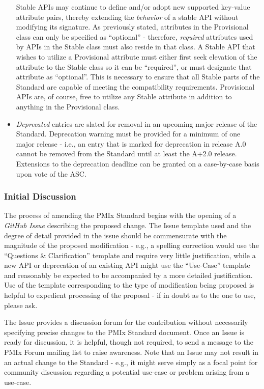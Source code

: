 \documentclass{article}
\begin{document}
\begin{itemize}
  Stable APIs may continue to define and/or adopt new supported
  key-value attribute pairs, thereby extending the \emph{behavior} of a
  stable API without modifying its signature. As previously stated,
  attributes in the Provisional class can only be specified as
  ``optional'' - therefore, \emph{required} attributes used by APIs in
  the Stable class must also reside in that class. A Stable API
  that wishes to utilize a Provisional attribute must either first
  seek elevation of the attribute to the Stable class so it can be
  ``required'', or must designate that attribute as ``optional''. This
  is necessary to ensure that all Stable parts of the Standard are
  capable of meeting the compatibility requirements. Provisional
  APIs are, of course, free to utilize any Stable attribute in
  addition to anything in the Provisional class.
\item
  \textit{Deprecated} entries are slated for removal in an upcoming
  major release of the Standard. Deprecation warning must be provided
  for a minimum of one major release - i.e., an entry that is marked for
  deprecation in release A.0 cannot be removed from the Standard until
  at least the A+2.0 release. Extensions to the deprecation deadline can
  be granted on a case-by-case basis upon vote of the ASC.
\end{itemize}

\hypertarget{initial-discussion}{%
\subsubsection{Initial Discussion}%
\label{initial-discussion}}

The process of amending the PMIx Standard begins with the opening of a
\textit{GitHub Issue} describing the proposed change. The Issue template
used and the degree of detail provided in the issue should be
commensurate with the magnitude of the proposed modification - e.g., a
spelling correction would use the ``Questions \& Clarification''
template and require very little justification, while a new API or
deprecation of an existing API might use the ``Use-Case'' template and
reasonably be expected to be accompanied by a more detailed
justification. Use of the template corresponding to the type of
modification being proposed is helpful to expedient processing of the
proposal - if in doubt as to the one to use, please ask.

The Issue provides a discussion forum for the contribution without
necessarily specifying precise changes to the PMIx Standard document.
Once an Issue is ready for discussion, it is helpful, though not
required, to send a message to the PMIx Forum mailing list to raise
awareness. Note that an Issue may not result in an actual change to the
Standard - e.g., it might serve simply as a focal point for community
discussion regarding a potential use-case or problem arising from a
use-case.
\end{document}
